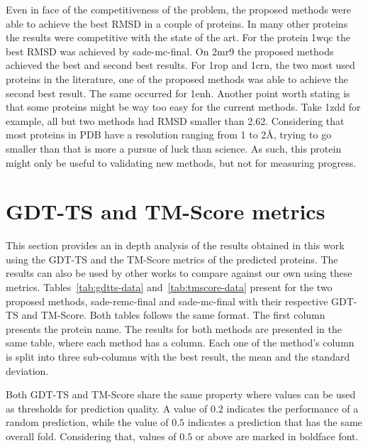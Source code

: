 Even in face of the competitiveness of the problem, the proposed methods were
able to achieve the best RMSD in a couple of proteins. In many other proteins
the results were competitive with the state of the art. For the protein 1wqc
the best RMSD was achieved by sade-mc-final. On 2mr9 the proposed methods
achieved the best and second best results. For 1rop and 1crn, the two most used
proteins in the literature, one of the proposed methods was able to achieve
the second best result. The same occurred for 1enh. Another point worth stating
is that some proteins might be way too easy for the current methods. Take 1zdd
for example, all but two methods had RMSD smaller than 2.62. Considering that
most proteins in PDB have a resolution ranging from 1 to 2\AA, trying to go
smaller than that is more a pursue of luck than science. As such, this protein
might only be useful to validating new methods, but not for measuring progress.

\section{GDT-TS and TM-Score metrics}
\label{sec:other-metrics}

This section provides an in depth analysis of the results obtained in this
work using the GDT-TS and the TM-Score metrics of the predicted proteins. The
results can also be used by other works to compare against our own using
these metrics. Tables~\ref{tab:gdtts-data} and~\ref{tab:tmscore-data} present
for the two proposed methods, sade-remc-final and sade-mc-final with their
respective GDT-TS and TM-Score. Both tables follows the same format. The
first column presents the protein name. The results for both methods are
presented in the same table, where each method has a column. Each one of the
method's column is split into three sub-columns with the best result, the mean
and the standard deviation.

Both GDT-TS and TM-Score share the same property where values can be used as
thresholds for prediction quality. A value of $0.2$ indicates the performance of
a random prediction, while the value of $0.5$ indicates a prediction that has
the same overall fold. Considering that, values of $0.5$ or above are marked
in boldface font.

